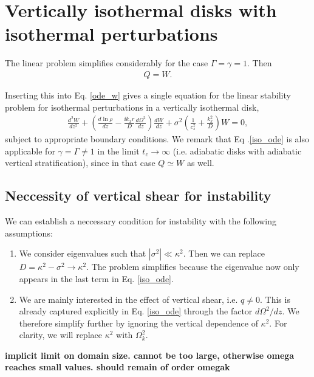 \section{Vertically isothermal disks with 
  isothermal perturbations}
The linear problem simplifies considerably for the case
$\Gamma=\gamma=1$. Then 
\begin{align}
  Q=W. 
\end{align}

Inserting this into Eq. \ref{ode_w} gives a single equation for the linear stability
problem for isothermal perturbations in a vertically isothermal disk, 
\begin{align}\label{iso_ode}
  \frac{d^2W}{dz^2} + \left(\frac{d\ln{\rho}}{dz} - \frac{\ii k_x
      r}{D}\frac{d\Omega^2}{dz}\right) \frac{dW}{dz} +
  \sigma^2\left(\frac{1}{c_s^2} + \frac{k_x^2}{D}\right)W=0, 
\end{align} 
subject to appropriate boundary conditions. We remark that Eq
.\ref{iso_ode} is also applicable for    
$\gamma=\Gamma\neq 1$ in the limit $t_c\to\infty$ (i.e. adiabatic
disks with adiabatic vertical stratification), since in that case  
$Q\simeq W$ as well. 

\subsection{Neccessity of vertical shear for instability}\label{integral_relation}
We can establish a neccessary condition for instability with the
following assumptions:

\begin{enumerate}
\item We consider eigenvalues such that
  $|\sigma^2|\ll \kappa^2$. Then we can replace $D=\kappa^2 -\sigma^2\to
  \kappa^2$. The problem simplifies because the eigenvalue now only
  appears in the last term in Eq. \ref{iso_ode}. 
\item We are mainly interested in the effect of vertical shear, i.e. $q\neq
  0$. This is already captured explicitly in Eq. \ref{iso_ode} through
  the factor $d\Omega^2/dz$. We 
  therefore simplify further by ignoring the vertical dependence of
  $\kappa^2$. For clarity, we will replace  $\kappa^2$ with $\Omega_k^2$.  
\end{enumerate}

{\bf implicit limit on domain size. cannot be too large, otherwise omega reaches small values. should remain of order
  omegak}

